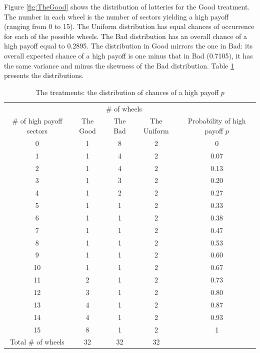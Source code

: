 \documentclass[12pt, a4paper]{article}
\begin{document}
Figure \ref{fig:TheGood} shows the distribution of lotteries for the Good treatment.
The number in each wheel is the number of sectors yielding a high payoff (ranging from 0 to 15).
The Uniform distribution has equal chances of occurrence for each of the possible wheels.
The Bad distribution has an overall chance of a high payoff equal to 0.2895.
The distribution in Good mirrors the one in Bad: its overall expected chance of a high payoff is one minus that in Bad (0.7105), it has the same variance and minus the skewness of the Bad distribution.
Table \ref{tab:distr} presents the distributions.


\begin{table}[htbp]
\centering \caption{The treatments: the distribution of chances of a high payoff $p$}\label{tab:distr}
\begin{threeparttable}
\begin{tabular}
   {@{}
	*5c
	@{}
	}
\toprule
	&	\multicolumn{3}{c}{\# of wheels}&\\
	\cmidrule{2-4}
\# of high payoff sectors 	&	{The Good}&{The Bad}&	{The Uniform}& {Probability of high payoff $p$}\\
\midrule
0	    &	1&       8&	2& 0   \\
1	    &	1&       4&	2& 0.07\\
2	    &	1&       4&	2& 0.13\\
3	    &	1&       3&	2& 0.20\\
4	    &	1&       2&	2& 0.27\\
5	    &	1&       1&	2& 0.33\\
6	    &	1&       1&	2& 0.38\\
7	    &	1&       1&	2& 0.47\\
8	    &	1&       1&	2& 0.53\\
9	    &	1&       1&	2& 0.60\\
10	    & 1&       1&	2& 0.67\\
11	    & 2&       1&	2& 0.73\\
12	    &	3&       1&	2& 0.80\\
13	    &	4&       1&	2& 0.87\\
14	    &	4&       1&	2& 0.93\\
15	    &	8&       1&	2& 1   \\
\midrule
Total \# of wheels	&	32&       32&	32&\\
\bottomrule

\end{tabular}
\end{threeparttable}
\end{table}
\end{document}
